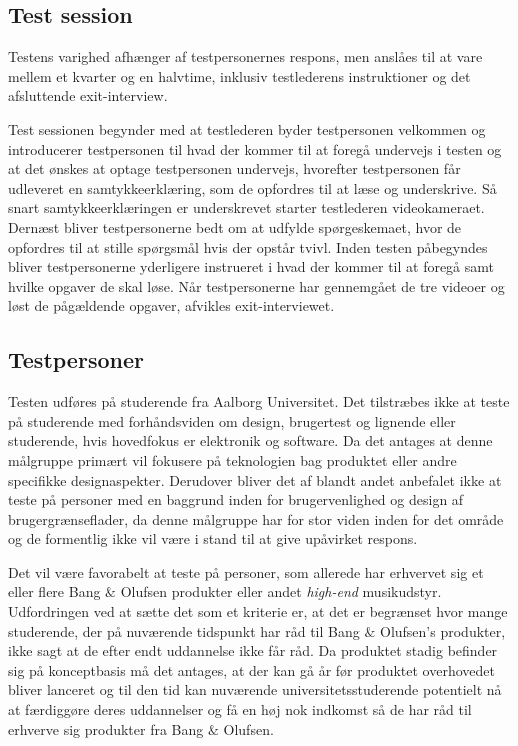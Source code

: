 \subsection{Test session}
\label{TestSessionValgAfGestikker}
%
Testens varighed afhænger af testpersonernes respons, men anslåes til at vare mellem et kvarter og en halvtime, inklusiv testlederens instruktioner og det afsluttende exit-interview.

Test sessionen begynder med at testlederen byder testpersonen velkommen og introducerer testpersonen til hvad der kommer til at foregå undervejs i testen og at det ønskes at optage testpersonen undervejs, hvorefter testpersonen får udleveret en samtykkeerklæring, som de opfordres til at læse og underskrive. Så snart samtykkeerklæringen er underskrevet starter testlederen videokameraet. Dernæst bliver testpersonerne bedt om at udfylde spørgeskemaet, hvor de opfordres til at stille spørgsmål hvis der opstår tvivl. Inden testen påbegyndes bliver testpersonerne yderligere instrueret i hvad der kommer til at foregå samt hvilke opgaver de skal løse. Når testpersonerne har gennemgået de tre videoer og løst de pågældende opgaver, afvikles exit-interviewet. 
%

\subsection{Testpersoner}
\label{TestpersonerValgAfGestikker}
%
Testen udføres på studerende fra Aalborg Universitet. Det tilstræbes ikke at teste på studerende med forhåndsviden om design, brugertest og lignende eller studerende, hvis hovedfokus er elektronik og software. Da det antages at denne målgruppe primært vil fokusere på teknologien bag produktet eller andre specifikke designaspekter. Derudover bliver det af \textcite[s. 110]{Book:OUE} blandt andet anbefalet ikke at teste på personer med en baggrund inden for brugervenlighed og design af brugergrænseflader, da denne målgruppe har for stor viden inden for det område og de formentlig ikke vil være i stand til at give upåvirket respons.

Det vil være favorabelt at teste på personer, som allerede har erhvervet sig et eller flere Bang $\&$ Olufsen produkter eller andet \textit{high-end} musikudstyr. Udfordringen ved at sætte det som et kriterie er, at det er begrænset hvor mange studerende, der på nuværende tidspunkt har råd til Bang $\&$ Olufsen's produkter, ikke sagt at de efter endt uddannelse ikke får råd. Da produktet stadig befinder sig på konceptbasis må det antages, at der kan gå år før produktet overhovedet bliver lanceret og til den tid kan nuværende universitetsstuderende potentielt nå at færdiggøre deres uddannelser og få en høj nok indkomst så de har råd til erhverve sig produkter fra Bang $\&$ Olufsen.
%

